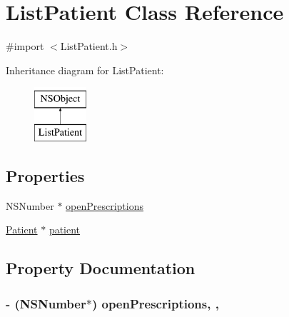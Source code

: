 \hypertarget{interface_list_patient}{}\section{List\+Patient Class Reference}
\label{interface_list_patient}


{\ttfamily \#import $<$List\+Patient.\+h$>$}

Inheritance diagram for List\+Patient\+:\begin{figure}[H]
\begin{center}
\leavevmode
\includegraphics[height=2.000000cm]{interface_list_patient}
\end{center}
\end{figure}
\subsection*{Properties}
\begin{DoxyCompactItemize}
\item 
N\+S\+Number $\ast$ \hyperlink{interface_list_patient_a22743e84a112fd7a9394e128341d8bec}{open\+Prescriptions}
\item 
\hyperlink{interface_patient}{Patient} $\ast$ \hyperlink{interface_list_patient_ad63da64340f3723b7de206c66ee6a927}{patient}
\end{DoxyCompactItemize}


\subsection{Property Documentation}
\hypertarget{interface_list_patient_a22743e84a112fd7a9394e128341d8bec}{}
\subsubsection[{open\+Prescriptions}]{\setlength{\rightskip}{0pt plus 5cm}-\/ (N\+S\+Number$\ast$) open\+Prescriptions\hspace{0.3cm}{\ttfamily [read]}, {\ttfamily [write]}, {\ttfamily [atomic]}}\label{interface_list_patient_a22743e84a112fd7a9394e128341d8bec}
\hypertarget{interface_list_patient_ad63da64340f3723b7de206c66ee6a927}{}

